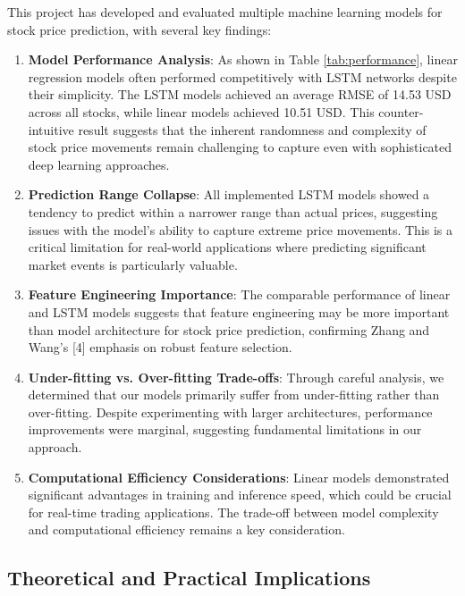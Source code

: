 \documentclass[sigconf]{acmart}
\begin{document}
This project has developed and evaluated multiple machine learning models for stock price prediction, with several key findings:

\begin{enumerate}
\item \textbf{Model Performance Analysis}: As shown in Table \ref{tab:performance}, linear regression models often performed competitively with LSTM networks despite their simplicity. The LSTM models achieved an average RMSE of 14.53 USD across all stocks, while linear models achieved 10.51 USD. This counter-intuitive result suggests that the inherent randomness and complexity of stock price movements remain challenging to capture even with sophisticated deep learning approaches.

\item \textbf{Prediction Range Collapse}: All implemented LSTM models showed a tendency to predict within a narrower range than actual prices, suggesting issues with the model's ability to capture extreme price movements. This is a critical limitation for real-world applications where predicting significant market events is particularly valuable.

\item \textbf{Feature Engineering Importance}: The comparable performance of linear and LSTM models suggests that feature engineering may be more important than model architecture for stock price prediction, confirming Zhang and Wang's [4] emphasis on robust feature selection.

\item \textbf{Under-fitting vs. Over-fitting Trade-offs}: Through careful analysis, we determined that our models primarily suffer from under-fitting rather than over-fitting. Despite experimenting with larger architectures, performance improvements were marginal, suggesting fundamental limitations in our approach.

\item \textbf{Computational Efficiency Considerations}: Linear models demonstrated significant advantages in training and inference speed, which could be crucial for real-time trading applications. The trade-off between model complexity and computational efficiency remains a key consideration.
\end{enumerate}

\subsection{Theoretical and Practical Implications}
\end{document}
